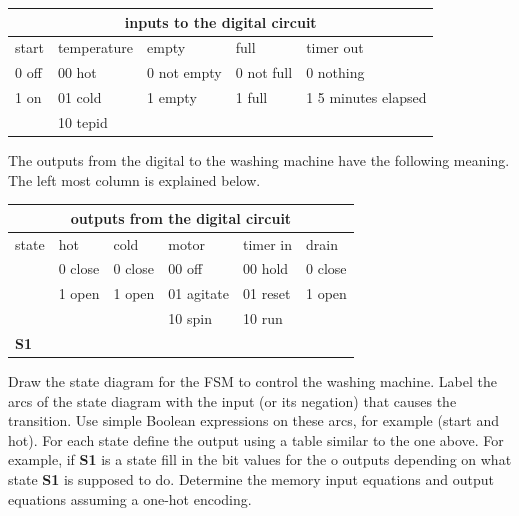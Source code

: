 \begin{enumerate}
\begin{tabular}{|l|l|l|l|l|} \hline
\multicolumn{5}{|c|}{inputs to the digital circuit}		\\ \hline \hline
start & temperature & empty       & full       & timer out 	\\ \hline	
0 off & 00 hot      & 0 not empty & 0 not full & 0 nothing	\\ \hline 
1 on  & 01 cold     & 1 empty     & 1 full     & 1 5 minutes elapsed 	\\ \hline 
      & 10 tepid    &		  &	       &		\\ \hline
\end{tabular}

The outputs from the digital to the washing machine have the following meaning.
The left most column is explained below.

\begin{tabular}{|l|||l|l|l|l|l|} \hline
\multicolumn{6}{|c|}{outputs from the digital circuit}			\\ \hline \hline
state & hot     & cold    & motor      & timer in   & drain 	\\ \hline
      & 0 close & 0 close & 00 off     & 00 hold    & 0 close	\\ \hline
      & 1 open  & 1 open  & 01 agitate & 01 reset   & 1 open	\\ \hline
      &		&         & 10 spin    & 10 run     &		\\ \hline \hline
{\bf S1}    &	&	  &	       &	    &		\\ \hline
\end{tabular}

Draw the state diagram for the FSM to control the washing machine.  
Label the arcs of the state diagram with the input (or its negation) 
that causes the transition.  Use simple Boolean expressions on these 
arcs, for example (start and hot).
For each state define the output using a table similar to the one above.
For example, if {\bf S1} is a state fill in the bit values for the o
outputs depending on what state {\bf S1} is supposed to do.
Determine the memory input equations and output equations assuming a one-hot 
encoding.


\end{enumerate}
